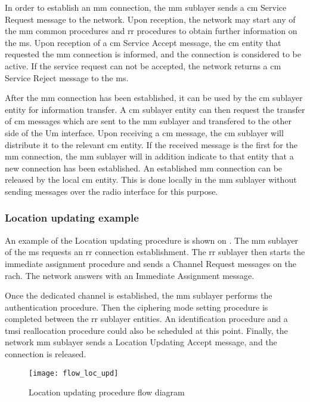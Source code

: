   In order to establish an \gls{mm} connection, the \gls{mm} sublayer
  sends a \gls{cm} Service Request message to the network. Upon
  reception, the network may start any of the \gls{mm} common
  procedures and \gls{rr} procedures to obtain further information on
  the \gls{ms}. Upon reception of a \gls{cm} Service Accept message,
  the \gls{cm} entity that requested the \gls{mm} connection is
  informed, and the connection is considered to be active. If the
  service request can not be accepted, the network returns a \gls{cm}
  Service Reject message to the \gls{ms}.

  After the \gls{mm} connection has been established, it can be used
  by the \gls{cm} sublayer entity for information transfer. A \gls{cm}
  sublayer entity can then request the transfer of \gls{cm} messages
  which are sent to the \gls{mm} sublayer and transfered to the other
  side of the Um interface. Upon receiving a \gls{cm} message, the
  \gls{cm} sublayer will distribute it to the relevant \gls{cm}
  entity. If the received message is the first for the \gls{mm}
  connection, the \gls{mm} sublayer will in addition indicate to that
  entity that a new connection has been established. An established
  \gls{mm} connection can be released by the local \gls{cm} entity.
  This is done locally in the \gls{mm} sublayer without sending
  messages over the radio interface for this purpose.

  \subsubsection{Location updating example}

  An example of the Location updating procedure is shown on
  . The \gls{mm} sublayer of the \gls{ms}
  requests an \gls{rr} connection establishment. The \gls{rr} sublayer
  then starts the immediate assignment procedure and sends a Channel
  Request messages on the \gls{rach}. The network answers with an
  Immediate Assignment message.

  Once the dedicated channel is established, the \gls{mm} sublayer
  performs the authentication procedure. Then the ciphering mode
  setting procedure is completed between the \gls{rr} sublayer
  entities. An identification procedure and a \gls{tmsi}
  reallocation procedure could also be scheduled at this point.
  Finally, the network \gls{mm} sublayer sends a Location Updating
  Accept message, and the connection is released.

    \begin{figure}[h]
      \centering
      \texttt{[image: flow\_loc\_upd]}
      \caption{Location updating procedure flow
      diagram~\cite[p.~117]{3gpp_ts_2014-6}}
      \label{fig:flow_loc_upd}
    \end{figure}

